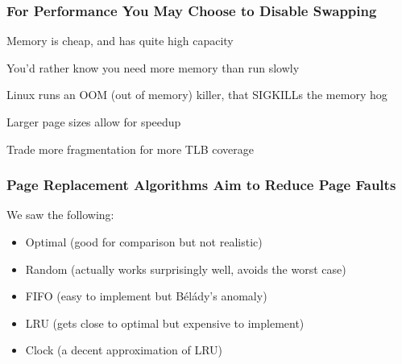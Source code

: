   \begin{frame}
    \frametitle{For Performance You May Choose to Disable Swapping}

    Memory is cheap, and has quite high capacity

    \hspace{2em} You'd rather know you need more memory than run slowly

    \hspace{4em} Linux runs an OOM (out of memory) killer, that SIGKILLs the memory hog

    \vspace{2em}

    Larger page sizes allow for speedup

    \hspace{2em} Trade more fragmentation for more TLB coverage
  \end{frame}

  \begin{frame}
    \frametitle{Page Replacement Algorithms Aim to Reduce Page Faults}

    We saw the following:
    \begin{itemize}
      \item Optimal (good for comparison but not realistic)
      \item Random (actually works surprisingly well, avoids the worst case)
      \item FIFO (easy to implement but Bélády's anomaly)
      \item LRU (gets close to optimal but expensive to implement)
      \item Clock (a decent approximation of LRU)
    \end{itemize}
  \end{frame}

